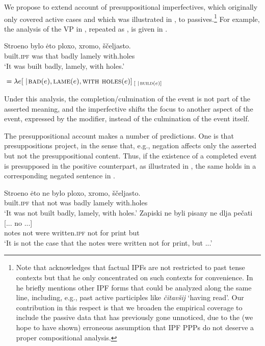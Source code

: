 \documentclass[output=paper,
modfonts,
newtxmath,
hidelinks
]{langscibook}
\begin{document}
We propose to extend  account of presuppositional imperfectives, which originally only covered active cases and which was illustrated in , to passives.\footnote{Note that \citet{gronndiss} acknowledges that factual IPFs are not restricted to past tense contexts but that he only concentrated on such contexts for convenience. In \citet{gronn15} he briefly mentions other IPF forms that could be analyzed along the same line, including, e.g., past active participles like \textit{čitavšij} `having read'. Our contribution in this respect is that we broaden the empirical coverage to include the passive data that has previously gone unnoticed, due to the (we hope to have shown) erroneous assumption that IPF PPPs do not deserve a proper compositional analysis.} For example, the analysis of the VP in , repeated as , is given in .

\ea\gll	Stroeno bylo \.{e}to ploxo, xromo, ščeljasto.\\
	built.\textsc{ipf} was that badly lamely with.holes\\
    \glt	`It was built badly, lamely, with holes.'\label{ploxo}
    \z

\ea {}${}=\lambda e[ \hspace{0.3em}|\hspace{0.1em} \textsc{bad}(e), \textsc{lame}(e), \textsc{with holes}(e)]_{\hspace{2pt}[ \hspace{0.3em} |\hspace{0.1em}\textsc{build}(e)]}$\label{ploxoanalysis}
\z

\noindent Under this analysis, the completion/culmination of the event is not part of the asserted meaning, and the imperfective shifts the focus to another aspect of the event, expressed by the  modifier, instead of the culmination of the event itself. 

The presuppositional account makes a number of predictions. One is that presuppositions project, in the sense that, e.g., negation affects only the asserted but not the presuppositional content. Thus, if the existence of a completed event is presupposed in the positive counterpart, as illustrated in , the same holds in a corresponding negated sentence in .

\ea\label{stroenoneg}
\ea\gll 	Stroeno \.{e}to ne bylo ploxo, xromo, ščeljasto. \\
	built.\textsc{ipf} that not was badly lamely with.holes\\
 \glt   `It was not built badly, lamely, with holes.'
\ex\gll 	Zapiski ne byli pisany ne dlja pečati [... no ...]	\\
	notes not were written.\textsc{ipf} not for print          {}       but {}\\
\glt    `It is not the case that the notes were written not for print, but ...'\label{stroenonegb}
\z\z
\end{document}
